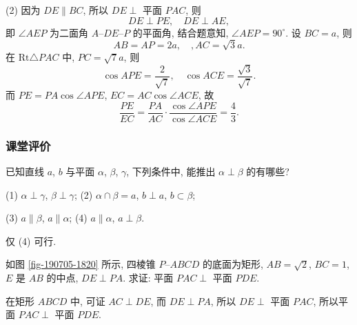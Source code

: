     (2) 因为 $DE\parallel BC$, 所以 $DE\perp$ 平面 $PAC$, 则
    \[DE\perp PE,\quad DE\perp AE,\]
    即 $\angle AEP$ 为二面角 $A\text{--}DE\text{--}P$ 的平面角, 结合题意知, $\angle AEP= 90^\circ$. 设 $BC=a$, 则
    \[AB=AP=2a,\quad, AC=\sqrt3a.\]
    在 $\mathrm{Rt}\triangle PAC$ 中, $PC=\sqrt7a$, 则
    \[\cos APE= \frac2{\sqrt7},\quad
        \cos ACE= \frac{\sqrt3}{\sqrt7}.\]
    而 $PE= PA\cos\angle APE$, $EC= AC\cos\angle ACE$, 故
    \[\frac{PE}{EC}
        = \frac{PA}{AC}\cdot \frac{\cos\angle APE}{\cos\angle ACE}
        = \frac43.\]
\endsolution
    
\subsubsection{课堂评价}

\begin{exercise}
    已知直线 $a$, $b$ 与平面 $\alpha$, $\beta$, $\gamma$, 下列条件中, 能推出 $\alpha \perp\beta$ 的有哪些?
     
    (1) $\alpha \perp\gamma$, $\beta\perp\gamma$;\qquad
    (2) $\alpha \cap\beta=a$, $b\perp a$, $b\subset\beta$;
    
    (3) $a\parallel \beta$, $a\parallel \alpha$;\qquad
    (4) $a\parallel \alpha$, $a\perp\beta$.
\end{exercise}
\beginsolution
    仅 (4) 可行.
\endsolution

\begin{exercise}
    如图 \ref{fig-190705-1820} 所示, 四棱锥 $P\text{--}ABCD$ 的底面为矩形, $AB=\sqrt2$, $BC=1$, $E$ 是 $AB$ 的中点, $DE\perp PA$. 求证: 平面 $PAC\perp$ 平面 $PDE$.
\end{exercise}
\beginsolution
    在矩形 $ABCD$ 中, 可证 $AC\perp DE$, 而 $DE\perp PA$, 所以 $DE\perp$ 平面 $PAC$, 所以平面 $PAC\perp$ 平面 $PDE$.
\endsolution

